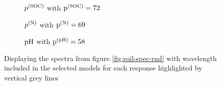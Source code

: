 	\begin{figure}[H]
		\begin{subfigure}[b]{\textwidth}
			\centering
			
			\caption{$p^{(\mathrm{SOC})}$ with $\mathrm{p}^{(\mathrm{SOC})} = 72$}
			\label{sfig:calib-soc}
		\end{subfigure}
		
		\begin{subfigure}[b]{\textwidth}
			\centering
			
			\caption{$p^{(\mathrm{N})}$ with $\mathrm{p}^{(\mathrm{N})} = 69$}
			\label{sfig:calib-n}
		\end{subfigure}

		\begin{subfigure}[b]{\textwidth}
			\centering
			
			\caption{$\mathrm{pH}$ with $\mathrm{p}^{(\mathrm{pH})} = 58$}
			\label{sfig:calib-ph}
		\end{subfigure}
		\caption{Displaying the spectra from figure \ref{fig:soil-spec-rnd} with wavelength included in the selected models for each response highlighted by vertical grey lines}
	\end{figure}

